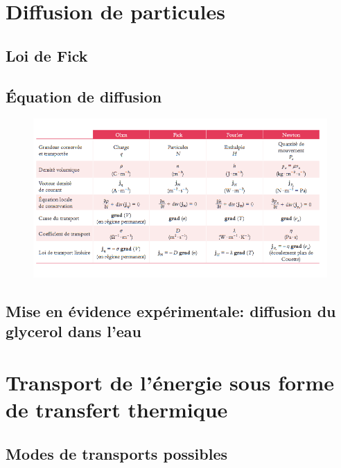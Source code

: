 \documentclass[10pt]{beamer}
\begin{document}
\section{Diffusion de particules}

\subsection{Loi de Fick}
\subsection{Équation de diffusion}
\begin{frame}{\insertsubsection}
\begin{figure}
    \centering
    \includegraphics[width=1\textwidth]{TableauPhenomenesTransportsBUP.png}
\end{figure}
\end{frame}


\subsection{Mise en évidence expérimentale: diffusion du glycerol dans l'eau}
\section{Transport de l'énergie sous forme de transfert thermique}
\subsection{Modes de transports possibles}
\end{document}
